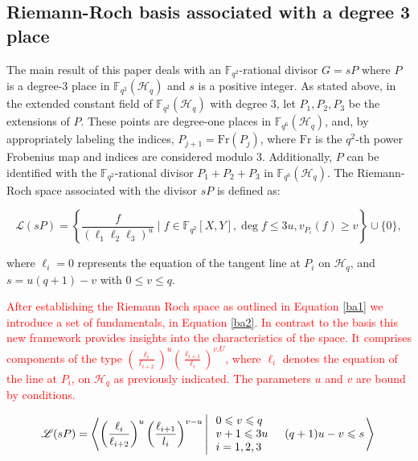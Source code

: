 \documentclass[a4paper]{amsart}
\theoremstyle{plain}
\theoremstyle{definition}
\theoremstyle{remark}
\begin{document}
\subsection{Riemann-Roch basis associated with a degree 3 place}
The main result of this paper deals with an $\mathbb{F}_{q^2}$-rational divisor $G=sP$ where $P$ is a degree-3 place in $\mathbb{F}_{q^2}(\mathscr{H}_q)$ and $s$ is a positive integer. As stated above, in the extended constant field of $\mathbb{F}_{q^2}(\mathscr{H}_q)$ with degree $3$, let $P_1, P_2, P_3$ be the extensions of $P$. These points are degree-one places in $\mathbb{F}_{q^6}(\mathscr{H}_q)$, and, by appropriately labeling the indices, $P_{j+1} = \text{Fr}(P_j)$, where $\text{Fr}$ is the $q^2$-th power Frobenius map and indices are considered modulo $3$. Additionally, $P$ can be identified with the $\mathbb{F}_{q^2}$-rational divisor $P_1+P_2+P_3$ in $\mathbb{F}_{q^6}(\mathscr{H}_q)$. The Riemann-Roch space associated with the divisor $sP$ \cite{korchmaros2013hermitian} is defined as:

\begin{equation}\label{ba1}
	\mathscr{L}(sP) = \left\{ \frac{f}{(\ell_1\ell_2\ell_3)^u} \mid f \in \mathbb{F}_{q^2}[X,Y], \deg f \leq 3u, v_{P_i}(f) \geq v \right\} \cup \{0\},
\end{equation}


where $\ell_i=0$ represents the equation of the tangent line at $P_i$ on $\mathscr{H}_q$, and $s = u(q+1) - v$ with $0 \leq v \leq q$.

\textcolor{red}{
After establishing the Riemann Roch space as outlined in Equation \ref{ba1} we introduce a set of fundamentals, in Equation \ref{ba2}. In contrast to the basis this new framework provides insights into the characteristics of the space. It comprises components of the type $\left(\frac{\ell_i}{\ell_{i+2}}\right)^u\left(\frac{\ell_{i+1}}{\ell_i}\right)^{v. U}$, where $\ell_i$ denotes the equation of the line at $P_i$, on $\mathscr{H}_q$ as previously indicated. The parameters $u$ and  $v$ are bound by conditions.}

\begin{equation} \label{ba2}
	\mathscr{L}(s P)=\left\langle\left(\frac{\ell_i}{\ell_{i+2}}\right)^u\left(\frac{\ell_{i+1}}{l_i}\right)^{v - u} \left\lvert\, \begin{array}{l}
		0 \leqslant v \leqslant q \\
		v+1 \leqslant 3 u \\
		i=1,2,3
	\end{array} \quad(q+1) u-v \leqslant s\right.\right\rangle \\
\end{equation}
\end{document}
